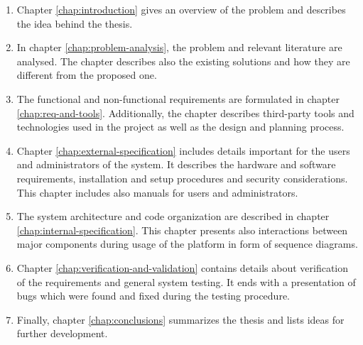 \begin{enumerate}
	\item Chapter \ref{chap:introduction} gives an overview of the problem and describes the idea behind the thesis.
	\item In chapter \ref{chap:problem-analysis}, the problem and relevant literature are analysed. The chapter describes also the existing solutions and how they are different from the proposed one.
	\item The functional and non-functional requirements are formulated in chapter \ref{chap:req-and-tools}. Additionally, the chapter describes third-party tools and technologies used in the project as well as the design and planning process.
	\item Chapter \ref{chap:external-specification} includes details important for the users and administrators of the system. It describes the hardware and software requirements, installation and setup procedures and security considerations. This chapter includes also manuals for users and administrators.
	\item The system architecture and code organization are described in chapter \ref{chap:internal-specification}. This chapter presents also interactions between major components during usage of the platform in form of sequence diagrams.
	\item Chapter \ref{chap:verification-and-validation} contains details about verification of the requirements and general system testing. It ends with a presentation of bugs which were found and fixed during the testing procedure.
	\item Finally, chapter \ref{chap:conclusions} summarizes the thesis and lists ideas for further development.
\end{enumerate}
